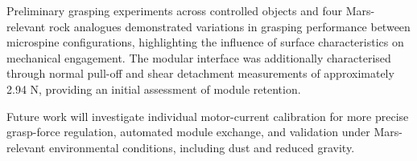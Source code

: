 \documentclass[letterpaper, 10 pt, conference, twoside]{ieeetran}
\begin{document}
Preliminary grasping experiments across controlled objects and four Mars-relevant rock analogues demonstrated variations in grasping performance between microspine configurations, highlighting the influence of surface characteristics on mechanical engagement. The modular interface was additionally characterised through normal pull-off and shear detachment measurements of approximately 2.94 N, providing an initial assessment of module retention.

Future work will investigate individual motor-current calibration for more precise grasp-force regulation, automated module exchange, and validation under Mars-relevant environmental conditions, including dust and reduced gravity.




\end{document}
